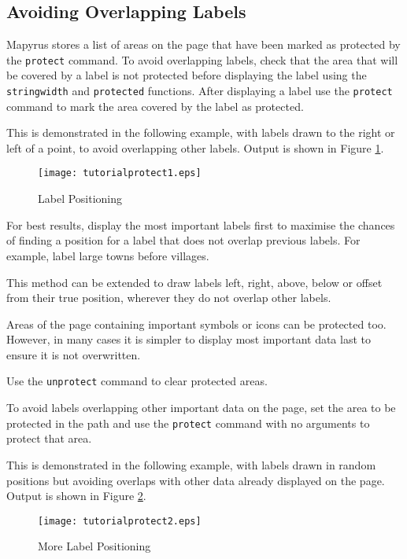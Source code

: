 \subsection{Avoiding Overlapping Labels}

Mapyrus stores a list of
areas on the page that have been marked as protected by the
\texttt{protect} command.
To avoid overlapping labels, check that the area that will be
covered by a label is not protected before displaying the
label using the \texttt{stringwidth} and \texttt{protected} functions.
After displaying a label use the \texttt{protect} command to mark
the area covered by the label as protected.

This is demonstrated in the following example, with labels
drawn to the right or left of a point, to avoid overlapping
other labels.
Output is shown in Figure \ref{tutorialprotect1}.



\begin{figure}[htb]
\texttt{[image: tutorialprotect1.eps]}
\caption{Label Positioning}
\label{tutorialprotect1}
\end{figure}

For best results, display the most important labels first to maximise the
chances of finding a position for a label that does not overlap previous
labels.  For example, label large towns before villages.

This method can be extended to draw labels left, right, above, below or offset
from their true position, wherever they do not overlap other labels.

Areas of the page containing important symbols or icons can be
protected too.  However, in many cases it is simpler to
display most important data last to ensure it is not overwritten.

Use the \texttt{unprotect} command to clear protected areas.

To avoid labels overlapping other important data on the page, set the
area to be protected in the path and use
the \texttt{protect} command with no arguments to protect that area.

This is demonstrated in the following example, with labels
drawn in random positions but avoiding overlaps with other data
already displayed on the page.
Output is shown in Figure \ref{tutorialprotect2}.



\begin{figure}[htb]
\texttt{[image: tutorialprotect2.eps]}
\caption{More Label Positioning}
\label{tutorialprotect2}
\end{figure}

